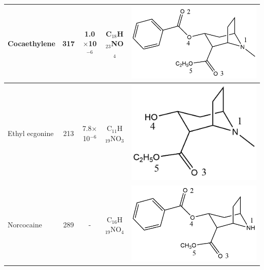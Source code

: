 \begin{table}
\begin{tabular}{lcccc}
Cocaethylene & 317   &1.0$\times$10$^{-6}$ &  C$_{18}$H$_{23}$NO$_4$ & \begin{minipage}[c]{0.26\linewidth}\centering \includegraphics[width=\linewidth]{pics/cocaine-chapter/cocaet_struct.png} \end{minipage} \\ \midrule
Ethyl ecgonine & 213 & 7.8$\times$10$^{-6}$ &C$_{11}$H$_{19}$NO$_3$ & \begin{minipage}[c]{0.26\linewidth}\centering \includegraphics[width=.8\linewidth]{pics/cocaine-chapter/EtEcg_struct.png} \end{minipage} \\ \midrule
Norcocaine & 289 & - &C$_{16}$H$_{19}$NO$_4$ & \begin{minipage}[c]{0.26\linewidth}\centering \includegraphics[width=\linewidth]{pics/cocaine-chapter/norcocaine_struct.png} \end{minipage}  \\ \midrule

\end{tabular}
\end{table}

